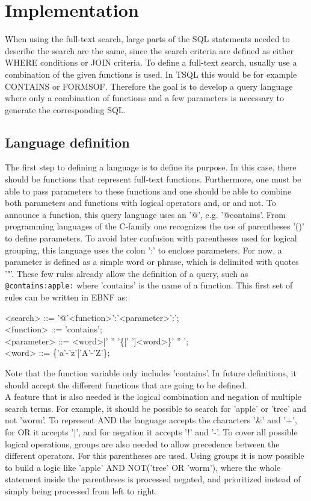 \newpage
\section{Implementation}
When using the full-text search, large parts of the SQL statements needed to describe the search are the same, since the search criteria are defined as either WHERE conditions or JOIN criteria. To define a full-text search, usually use a combination of the given functions is used. In \ac{TSQL} this would be for example CONTAINS or FORMSOF. Therefore the goal is to develop a query language where only a combination of functions and a few parameters is necessary to generate the corresponding SQL.
\subsection{Language definition}
The first step to defining a language is to define its purpose. In this case, there should be functions that represent full-text functions. Furthermore, one must be able to pass parameters to these functions and one should be able to combine both parameters and functions with logical operators and, or and not.
To announce a function, this query language uses an '@', e.g. '@contains'. From programming languages of the C-family one recognizes the use of parentheses '()' to define parameters. To avoid later confusion with parentheses used for logical grouping, this language uses the colon ':' to enclose parameters. For now, a parameter is defined as a simple word or phrase, which is delimited with quotes '"'. These few rules already allow the definition of a query, such as \lstinline[language=Fulltext-Search]$@contains:apple:$ where 'contains' is the name of a function.
This first set of rules can be written in \ac{EBNF} as:
\begin{grammar}
    <search> ::= '@'<function>':'<parameter>':'; \\
    <function> ::= 'contains'; \\
    <parameter> ::= <word>|' '' '\{[' ']<word>\}' '' '; \\
    <word> ::= \{'a'-'z'|'A'-'Z'\};
\end{grammar}
Note that the function variable only includes 'contains'. In future definitions, it should accept the different functions that are going to be defined.\\
A feature that is also needed is the logical combination and negation of multiple search terms. For example, it should be possible to search for 'apple' or 'tree' and not 'worm'. To represent AND the language accepts the characters '\&' and '+', for OR it accepts '|', and for negation it accepts '!' and '-'. To cover all possible logical operations, groups are also needed to allow precedence between the different operators. For this parentheses are used. Using groups it is now possible to build a logic like 'apple' AND NOT('tree' OR 'worm'), where the whole statement inside the parentheses is processed negated, and prioritized instead of simply being processed from left to right.\\
